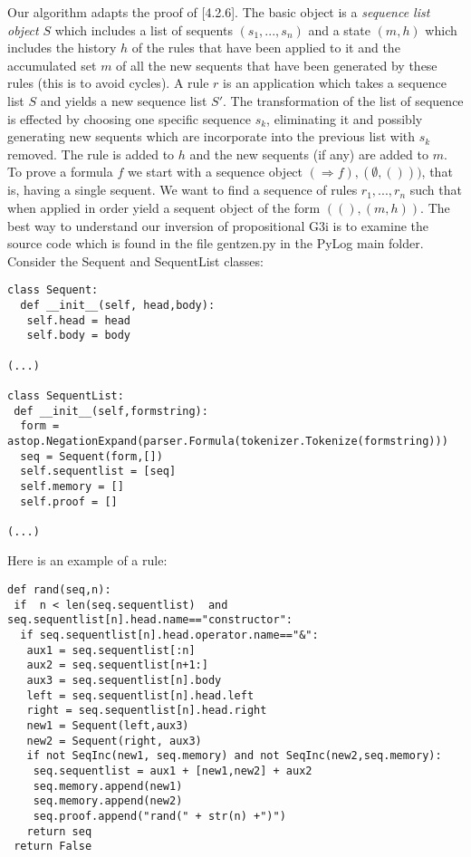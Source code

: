 \documentclass[12pt,leqno]{article}
\numberwithin{equation}{section}
\begin{document}
Our algorithm adapts the proof of \cite{tro}[4.2.6]. The basic object is a \emph{sequence list object} $S$ which includes a list of sequents $(s_1,...,s_n)$  and a state $(m,h)$ which includes the history $h$ of the rules that have been applied to it and the accumulated set  $m$ of all the new sequents that have been generated by these rules (this is to avoid cycles). A rule $r$  is an application which takes a sequence list $S$ and yields a new sequence list $S'$. The transformation of the list of sequence is effected by choosing one specific sequence $s_k$, eliminating it and possibly generating new sequents  which are incorporate into the previous list with $s_k$ removed. The rule is added to $h$ and the new sequents (if any) are added to $m$.
To prove a formula $f$ we start with a sequence object $(\Rightarrow f), (\emptyset,()))$, that is, having a single sequent. We want to find a sequence of rules $r_1,...,r_n$ such that when applied in order yield a sequent object of the form $((), (m,h))$.
The best way to understand our inversion of propositional G3i is to examine the source code which is found in the file gentzen.py in the PyLog main folder. Consider the Sequent and SequentList classes:

\begin{verbatim}
class Sequent:
  def __init__(self, head,body):
   self.head = head
   self.body = body
   
(...)   

class SequentList:
 def __init__(self,formstring):
  form = astop.NegationExpand(parser.Formula(tokenizer.Tokenize(formstring)))
  seq = Sequent(form,[])
  self.sequentlist = [seq]
  self.memory = []
  self.proof = []

(...)
\end{verbatim}

Here is an example of a rule:

\begin{verbatim}
def rand(seq,n):
 if  n < len(seq.sequentlist)  and seq.sequentlist[n].head.name=="constructor":
  if seq.sequentlist[n].head.operator.name=="&":
   aux1 = seq.sequentlist[:n]
   aux2 = seq.sequentlist[n+1:]
   aux3 = seq.sequentlist[n].body
   left = seq.sequentlist[n].head.left
   right = seq.sequentlist[n].head.right
   new1 = Sequent(left,aux3)
   new2 = Sequent(right, aux3)
   if not SeqInc(new1, seq.memory) and not SeqInc(new2,seq.memory):
    seq.sequentlist = aux1 + [new1,new2] + aux2
    seq.memory.append(new1)
    seq.memory.append(new2)
    seq.proof.append("rand(" + str(n) +")")
   return seq
 return False
\end{verbatim}
\end{document}
